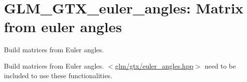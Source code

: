 \hypertarget{group__gtx__euler__angles}{\section{\-G\-L\-M\-\_\-\-G\-T\-X\-\_\-euler\-\_\-angles\-: \-Matrix from euler angles}
\label{group__gtx__euler__angles}
}


\-Build matrices from \-Euler angles.  


\-Build matrices from \-Euler angles. $<$\hyperlink{euler__angles_8hpp}{glm/gtx/euler\-\_\-angles.\-hpp}$>$ need to be included to use these functionalities. 